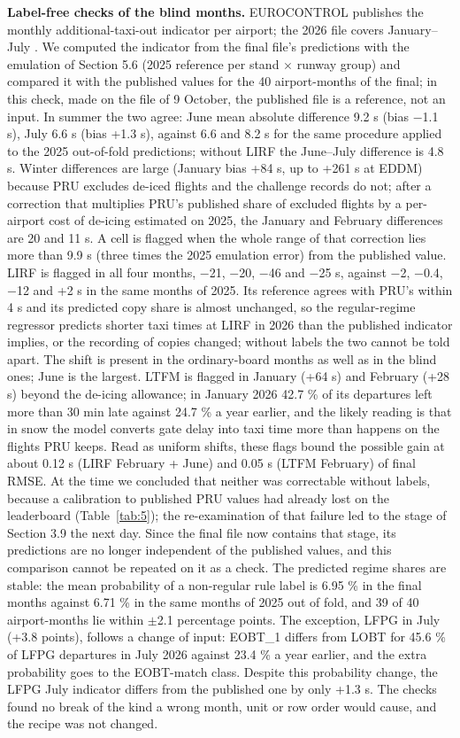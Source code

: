 \documentclass[11pt,a4paper]{article}
\begin{document}
\textbf{Label-free checks of the blind months.} EUROCONTROL publishes the monthly additional-taxi-out indicator per airport; the 2026 file covers January--July \autocite{eurocontrol2026atxotdata}. We computed the indicator from the final file's predictions with the emulation of Section 5.6 (2025 reference per stand $\times$ runway group) and compared it with the published values for the 40 airport-months of the final; in this check, made on the file of 9 October, the published file is a reference, not an input. In summer the two agree: June mean absolute difference 9.2 s (bias $-$1.1 s), July 6.6 s (bias +1.3 s), against 6.6 and 8.2 s for the same procedure applied to the 2025 out-of-fold predictions; without LIRF the June--July difference is 4.8 s. Winter differences are large (January bias +84 s, up to +261 s at EDDM) because PRU excludes de-iced flights and the challenge records do not; after a correction that multiplies PRU's published share of excluded flights by a per-airport cost of de-icing estimated on 2025, the January and February differences are 20 and 11 s. A cell is flagged when the whole range of that correction lies more than 9.9 s (three times the 2025 emulation error) from the published value. LIRF is flagged in all four months, $-$21, $-$20, $-$46 and $-$25 s, against $-$2, $-$0.4, $-$12 and +2 s in the same months of 2025. Its reference agrees with PRU's within 4 s and its predicted copy share is almost unchanged, so the regular-regime regressor predicts shorter taxi times at LIRF in 2026 than the published indicator implies, or the recording of copies changed; without labels the two cannot be told apart. The shift is present in the ordinary-board months as well as in the blind ones; June is the largest. LTFM is flagged in January (+64 s) and February (+28 s) beyond the de-icing allowance; in January 2026 42.7 \% of its departures left more than 30 min late against 24.7 \% a year earlier, and the likely reading is that in snow the model converts gate delay into taxi time more than happens on the flights PRU keeps. Read as uniform shifts, these flags bound the possible gain at about 0.12 s (LIRF February + June) and 0.05 s (LTFM February) of final RMSE. At the time we concluded that neither was correctable without labels, because a calibration to published PRU values had already lost on the leaderboard (Table~\ref{tab:5}); the re-examination of that failure led to the stage of Section 3.9 the next day. Since the final file now contains that stage, its predictions are no longer independent of the published values, and this comparison cannot be repeated on it as a check. The predicted regime shares are stable: the mean probability of a non-regular rule label is 6.95 \% in the final months against 6.71 \% in the same months of 2025 out of fold, and 39 of 40 airport-months lie within $\pm$2.1 percentage points. The exception, LFPG in July (+3.8 points), follows a change of input: EOBT\_1 differs from LOBT for 45.6 \% of LFPG departures in July 2026 against 23.4 \% a year earlier, and the extra probability goes to the EOBT-match class. Despite this probability change, the LFPG July indicator differs from the published one by only +1.3 s. The checks found no break of the kind a wrong month, unit or row order would cause, and the recipe was not changed.
\end{document}
